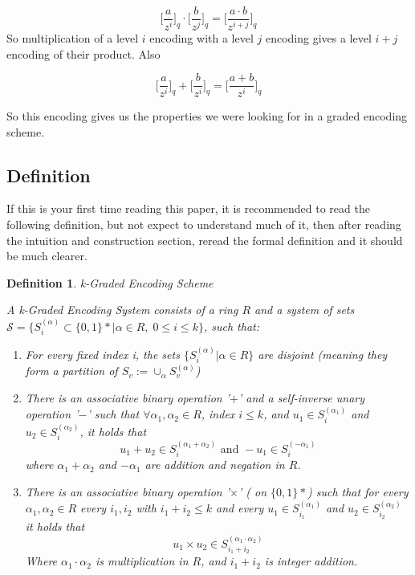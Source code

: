 \documentclass[12pt,twoside]{reedthesis}
\newtheorem{definition}{Definition}
\begin{document}
    \newcommand{\encode}[2]{\bigg[ \frac{#2}{z^{#1}}\bigg]_q}
    $$
    \encode{i}{a} \cdot \encode{j}{b} = \encode{i+j}{a \cdot b}
   $$
   So multiplication of a level $i$ encoding with a level $j$ encoding gives a level $i+j$ encoding of their product. Also
   
   $$\encode{i}{a} + \encode{i}{b} = \encode{i}{a+b}$$
   
   So this encoding gives us the properties we were looking for in a graded encoding scheme. 
    
     \subsection{Definition}
     If this is your first time reading this paper, it is recommended to read the following definition, but not expect to understand much of it, then after reading the intuition and construction section, reread the formal definition and it should be much clearer.
    
    \begin{definition}{k-Graded Encoding Scheme}
    \par A k-Graded Encoding System consists of a ring $R$ and a system of sets $\mathcal{S}= \{S_i^{(\alpha)} \subset \{0,1\}*| \alpha \in R, \; 0 \leq i \leq k \}$, such that:
    \begin{enumerate}
    \item For every fixed index i, the sets $\{S_i^{(\alpha)}| \alpha \in R \}$ are disjoint (meaning they form a partition of $S_v := \cup_\alpha S_v^{(\alpha)}$)
    
    \item There is an associative binary operation '$ + $' and a self-inverse unary operation '$-$' such that $\forall \alpha_1,\alpha_2 \in R$, index $i\leq k$, and $u_1 \in S_i^{(\alpha_1)}$ and $u_2 \in S_i^{(\alpha_2)}$, it holds that 
    $$u_1 + u_2 \in S_i^{(\alpha_1 + \alpha_2)} \text{ and } -u_1 \in S_i^{(-\alpha_1)}$$
    where $\alpha_1 + \alpha_2$ and $-\alpha_1$ are addition and negation in $R$.
    
    \item There is an associative binary operation '$\times$' ( on $\{ 0,1 \}*$) such that for every $\alpha_1,\alpha_2 \in R$ every $i_1,i_2$ with $i_1+i_2 \leq k$ and every $u_1 \in S_{i_1}^{(\alpha_1)}$ and $u_2 \in S_{i_2}^{(\alpha_2)}$ it holds that 
    $$u_1 \times u_2 \in S_{i_1 + i_2}^{(\alpha_1 \cdot \alpha_2)} $$
    Where $\alpha_1 \cdot \alpha_2$ is multiplication in $R$, and $i_1 + i_2$ is integer addition.
    
    
    \end{enumerate}
    
    
    \end{definition}
    
\end{document}

